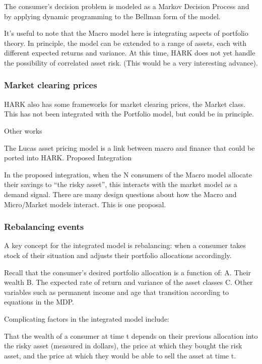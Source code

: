 The consumer’s decision problem is modeled as a Markov Decision Process and
by applying dynamic programming to the Bellman form of the model.

It’s useful to note that the Macro model here is integrating aspects of
portfolio theory. In principle, the model can be extended to a range of
assets, each with different expected returns and variance. At this time,
HARK does not yet handle the possibility of correlated asset risk. (This
would be a very interesting advance).

\subsubsection{Market clearing prices}

HARK also has some frameworks for market clearing prices, the Market class.
This has not been integrated with the Portfolio model, but could be in principle.

Other works

The Lucas asset pricing model is a link between macro and finance that could be ported into HARK.
Proposed Integration

In the proposed integration, when the N consumers of the Macro model allocate their savings to “the risky asset”, this interacts with the market model as a demand signal. There are many design questions about how the Macro and Micro/Market models interact. This is one proposal.

\subsubsection{Rebalancing events}

A key concept for the integrated model is rebalancing: when a consumer takes
stock of their situation and adjusts their portfolio allocations accordingly.

Recall that the consumer’s desired portfolio allocation is a function of:
A. Their wealth
B. The expected rate of return and variance of the asset classes
C. Other variables such as permanent income and age that transition
according to equations in the MDP.

Complicating factors in the integrated model include:

That the wealth of a consumer at time t depends on their previous allocation
into the risky asset (measured in dollars), the price at which they bought
the risk asset, and the price at which they would be
able to sell the asset at time t.

